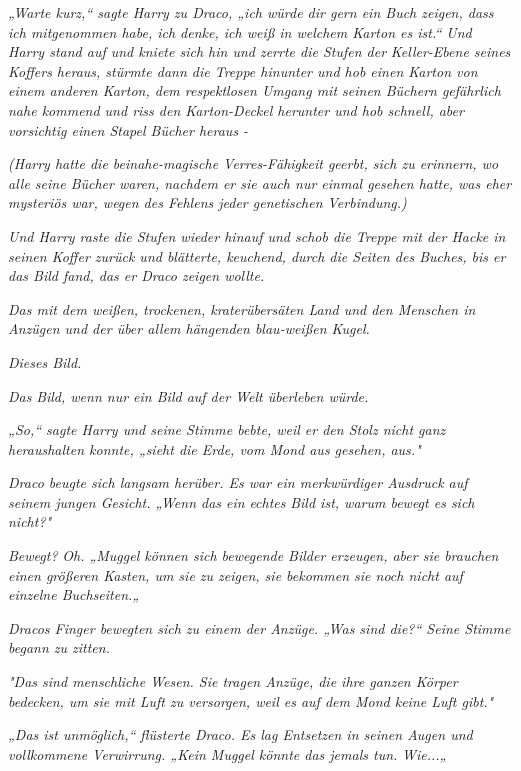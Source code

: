 {\emph{„Warte kurz,“ sagte Harry zu Draco, „ich würde dir gern ein Buch zeigen, dass ich mitgenommen habe, ich denke, ich weiß in welchem Karton es ist.“ Und Harry stand auf und kniete sich hin und zerrte die Stufen der} \emph{Keller-Ebene seines Koffers heraus, stürmte dann die Treppe hinunter und hob einen Karton von einem anderen Karton, dem respektlosen Umgang mit seinen Büchern gefährlich nahe kommend und riss den Karton-Deckel herunter und hob schnell, aber vorsichtig einen Stapel Bücher heraus -}

\emph{(Harry hatte die beinahe-magische Verres-Fähigkeit geerbt, sich zu erinnern, wo alle seine Bücher waren, nachdem er sie auch nur einmal gesehen hatte, was eher mysteriös war, wegen des Fehlens jeder genetischen Verbindung.)}

\emph{Und Harry raste die Stufen wieder hinauf und schob die Treppe mit der Hacke in seinen Koffer zurück und blätterte, keuchend, durch die Seiten des Buches, bis er das Bild fand, das er Draco zeigen wollte.}

\emph{Das mit dem weißen, trockenen, kraterübersäten Land und den Menschen in Anzügen und der über allem hängenden blau-weißen Kugel.}

\emph{Dieses Bild.}

\emph{\emph{Das}} \emph{Bild, wenn nur ein Bild auf der Welt überleben würde.}

\emph{„\emph{So,}“ sagte Harry und seine Stimme bebte, weil er den Stolz nicht ganz heraushalten konnte, „sieht die Erde, vom Mond aus gesehen, aus."}

\emph{Draco beugte sich langsam herüber. Es war ein merkwürdiger Ausdruck auf seinem jungen Gesicht. „Wenn das ein} \emph{\emph{echtes}} \emph{Bild ist, warum bewegt es sich nicht?"}

\emph{\emph{Bewegt?}} \emph{Oh. „Muggel können sich bewegende Bilder erzeugen, aber sie brauchen einen größeren Kasten, um sie zu zeigen, sie bekommen sie noch nicht auf einzelne Buchseiten.„}

\emph{Dracos Finger bewegten sich zu einem der Anzüge. „Was sind die?“ Seine Stimme begann zu zitten.}

\emph{"Das sind menschliche Wesen. Sie tragen Anzüge, die ihre ganzen Körper bedecken, um sie mit Luft zu versorgen, weil es auf dem Mond keine Luft gibt."}

\emph{„Das ist unmöglich,“ flüsterte Draco. Es lag Entsetzen in seinen Augen und vollkommene Verwirrung. „Kein Muggel könnte das jemals tun.} \emph{\emph{Wie...}„}

}
